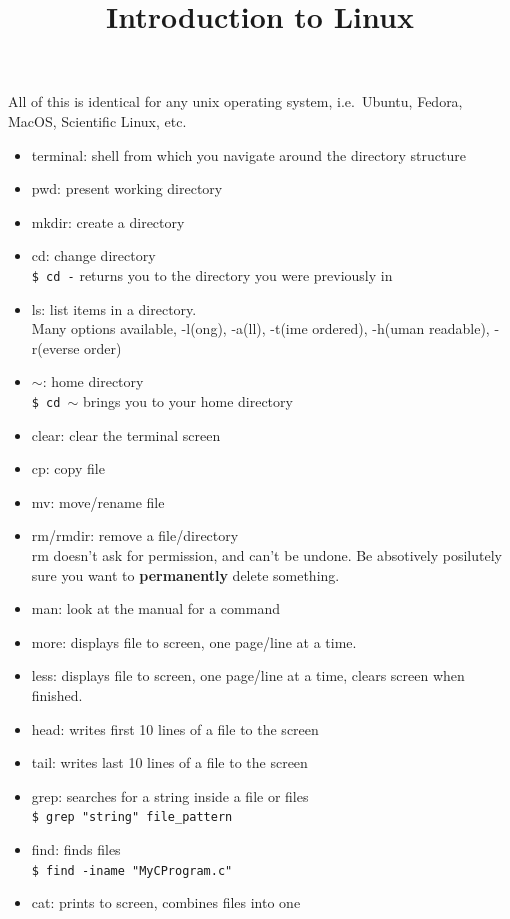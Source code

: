 \documentclass[11pt]{article}
\begin{document}
\title{Introduction to Linux}

\maketitle
All of this is identical for any unix operating system, i.e.~Ubuntu, Fedora, MacOS, Scientific Linux, etc.
\begin{itemize}
\item terminal: shell from which you navigate around the directory structure
%
%
\item pwd: present working directory
\item mkdir: create a directory
\item cd: change directory\\ \texttt{\$ cd -} returns you to the directory you were previously in
\item ls: list items in a directory. \\Many options available, -l(ong), -a(ll), -t(ime ordered), -h(uman readable), -r(everse order)
\item $\sim$: home directory \\ \texttt{\$ cd $\sim$} brings you to your home directory
\item clear: clear the terminal screen
\item cp: copy file
\item mv: move/rename file
\item rm/rmdir: remove a file/directory \\ rm doesn't ask for permission, and can't be undone. Be absotively posilutely sure you want to \textbf{permanently} delete something.
\item man: look at the manual for a command 
\item more: displays file to screen, one page/line at a time.
\item less: displays file to screen, one page/line at a time,  clears screen when finished. 
\item head: writes first 10 lines of a file to the screen
\item tail: writes last 10 lines of a file to the screen
\item grep: searches for a string inside a file or files\\ \texttt{\$ grep "string" file\_pattern}
\item find: finds files \\ \texttt{\$ find -iname "MyCProgram.c"}
\item cat: prints to screen, combines files into one

\end{itemize}
\end{document}
